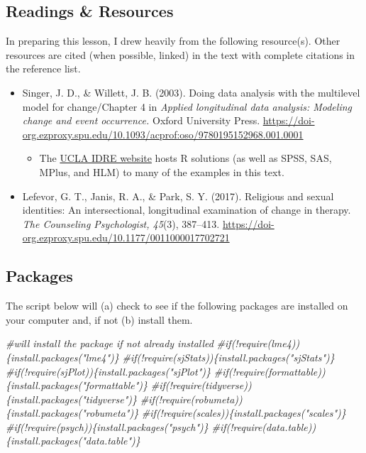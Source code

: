 \documentclass[
  11pt,
]{book}
\newenvironment{Shaded}{\begin{snugshade}}{\end{snugshade}}
\newcommand{\CommentTok}[1]{\textcolor[rgb]{0.56,0.35,0.01}{\textit{#1}}}
\providecommand{\tightlist}{%
  \setlength{\itemsep}{0pt}\setlength{\parskip}{0pt}}
\begin{document}
\hypertarget{readings-resources-2}{%
\subsection{Readings \& Resources}\label{readings-resources-2}}

In preparing this lesson, I drew heavily from the following resource(s). Other resources are cited (when possible, linked) in the text with complete citations in the reference list.

\begin{itemize}
\tightlist
\item
  Singer, J. D., \& Willett, J. B. (2003). Doing data analysis with the multilevel model for change/Chapter 4 in \emph{Applied longitudinal data analysis: Modeling change and event occurrence.} Oxford University Press. \url{https://doi-org.ezproxy.spu.edu/10.1093/acprof:oso/9780195152968.001.0001}

  \begin{itemize}
  \tightlist
  \item
    The \href{https://stats.idre.ucla.edu/other/examples/alda/}{UCLA IDRE website} hosts R solutions (as well as SPSS, SAS, MPlus, and HLM) to many of the examples in this text.
  \end{itemize}
\item
  Lefevor, G. T., Janis, R. A., \& Park, S. Y. (2017). Religious and sexual identities: An intersectional, longitudinal examination of change in therapy. \emph{The Counseling Psychologist, 45}(3), 387--413. \url{https://doi-org.ezproxy.spu.edu/10.1177/0011000017702721}
\end{itemize}

\hypertarget{packages-3}{%
\subsection{Packages}\label{packages-3}}

The script below will (a) check to see if the following packages are installed on your computer and, if not (b) install them.

\begin{Shaded}
\begin{Highlighting}[]
\CommentTok{\#will install the package if not already installed}
\CommentTok{\#if(!require(lme4))\{install.packages("lme4")\}}
\CommentTok{\#if(!require(sjStats))\{install.packages("sjStats")\}}
\CommentTok{\#if(!require(sjPlot))\{install.packages("sjPlot")\}}
\CommentTok{\#if(!require(formattable))\{install.packages("formattable")\}}
\CommentTok{\#if(!require(tidyverse))\{install.packages("tidyverse")\}}
\CommentTok{\#if(!require(robumeta))\{install.packages("robumeta")\}}
\CommentTok{\#if(!require(scales))\{install.packages("scales")\}}
\CommentTok{\#if(!require(psych))\{install.packages("psych")\}}
\CommentTok{\#if(!require(data.table))\{install.packages("data.table")\}}
\end{Highlighting}
\end{Shaded}
\end{document}
